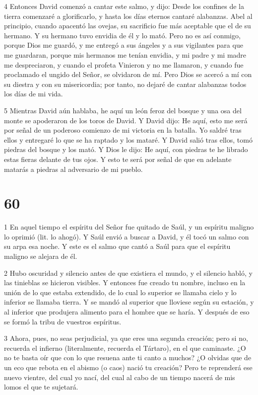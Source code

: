 \par 4 Entonces David comenzó a cantar este salmo, y dijo: Desde los confines de la tierra comenzaré a glorificarlo, y hasta los días eternos cantaré alabanzas. Abel al principio, cuando apacentó las ovejas, su sacrificio fue más aceptable que el de su hermano. Y su hermano tuvo envidia de él y lo mató. Pero no es así conmigo, porque Dios me guardó, y me entregó a sus ángeles y a sus vigilantes para que me guardaran, porque mis hermanos me tenían envidia, y mi padre y mi madre me despreciaron, y cuando el profeta Vinieron y no me llamaron, y cuando fue proclamado el ungido del Señor, se olvidaron de mí. Pero Dios se acercó a mí con su diestra y con su misericordia; por tanto, no dejaré de cantar alabanzas todos los días de mi vida.

\par 5 Mientras David aún hablaba, he aquí un león feroz del bosque y una osa del monte se apoderaron de los toros de David. Y David dijo: He aquí, esto me será por señal de un poderoso comienzo de mi victoria en la batalla. Yo saldré tras ellos y entregaré lo que se ha raptado y los mataré. Y David salió tras ellos, tomó piedras del bosque y los mató. Y Dios le dijo: He aquí, con piedras te he librado estas fieras delante de tus ojos. Y esto te será por señal de que en adelante matarás a piedras al adversario de mi pueblo.

\chapter{60}

\par 1 En aquel tiempo el espíritu del Señor fue quitado de Saúl, y un espíritu maligno lo oprimió (lit. lo ahogó). Y Saúl envió a buscar a David, y él tocó un salmo con su arpa esa noche. Y este es el salmo que cantó a Saúl para que el espíritu maligno se alejara de él.

\par 2 Hubo oscuridad y silencio antes de que existiera el mundo, y el silencio habló, y las tinieblas se hicieron visibles. Y entonces fue creado tu nombre, incluso en la unión de lo que estaba extendido, de lo cual lo superior se llamaba cielo y lo inferior se llamaba tierra. Y se mandó al superior que lloviese según su estación, y al inferior que produjera alimento para el hombre que se haría. Y después de eso se formó la tribu de vuestros espíritus.

\par 3 Ahora, pues, no seas perjudicial, ya que eres una segunda creación; pero si no, recuerda el infierno (literalmente, recuerda el Tártaro), en el que caminaste. ¿O no te basta oír que con lo que resuena ante ti canto a muchos? ¿O olvidas que de un eco que rebota en el abismo (o caos) nació tu creación? Pero te reprenderá ese nuevo vientre, del cual yo nací, del cual al cabo de un tiempo nacerá de mis lomos el que te sujetará.

